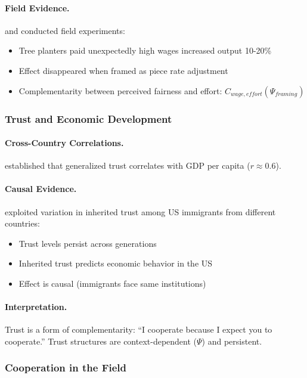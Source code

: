 \documentclass[12pt,a4paper]{article}
\begin{document}
\paragraph{Field Evidence.}
\citet{fehretal2009} and \citet{listmillimet2008} conducted field experiments:
\begin{itemize}
  \item Tree planters paid unexpectedly high wages increased output 10-20\%
  \item Effect disappeared when framed as piece rate adjustment
  \item Complementarity between perceived fairness and effort: $C_{wage,effort}(\Psi_{framing})$
\end{itemize}

\subsubsection{Trust and Economic Development}

\paragraph{Cross-Country Correlations.}
\citet{knackzak} established that generalized trust correlates with GDP per capita ($r \approx 0.6$).

\paragraph{Causal Evidence.}
\citet{alganandcahuc2010} exploited variation in inherited trust among
US immigrants from different countries:
\begin{itemize}
  \item Trust levels persist across generations
  \item Inherited trust predicts economic behavior in the US
  \item Effect is causal (immigrants face same institutions)
\end{itemize}

\paragraph{Interpretation.}
Trust is a form of complementarity: ``I cooperate because I expect you to cooperate.''
Trust structures are context-dependent ($\Psi$) and persistent.

\subsubsection{Cooperation in the Field}
\end{document}
